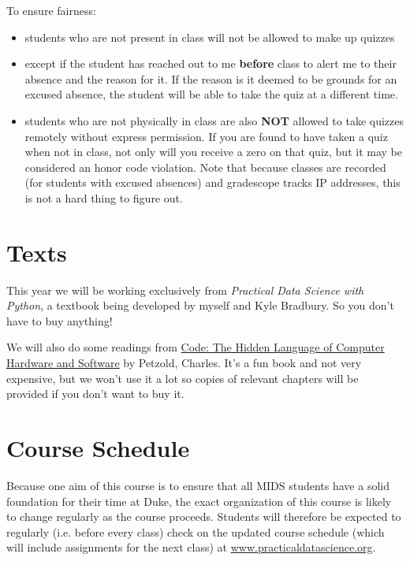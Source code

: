 \documentclass[12pt]{article}
\begin{document}
To ensure fairness: 

\begin{itemize}
	\item students who are not present in class will not be allowed to make up quizzes
	\item except if the student has reached out to me \textbf{before} class to alert me to their absence and the reason for it. If the reason is it deemed to be grounds for an excused absence, the student will be able to take the quiz at a different time.
	\item students who are not physically in class are also \textbf{NOT} allowed to take quizzes remotely without express permission. If you are found to have taken a quiz when not in class, not only will you receive a zero on that quiz, but it may be considered an honor code violation. Note that because classes are recorded (for students with excused absences) and gradescope tracks IP addresses, this is not a hard thing to figure out.
\end{itemize}


\section{Texts}

This year we will be working exclusively from \emph{Practical Data Science with Python}, a textbook being developed by myself and Kyle Bradbury. So you don't have to buy anything!

We will also do some readings from \href{https://www.amazon.com/Code-Language-Computer-Hardware-Software/dp/0735611319}{Code: The Hidden Language of Computer Hardware and Software} by Petzold, Charles. It's a fun book and not very expensive, but we won't use it a lot so copies of relevant chapters will be provided if you don't want to buy it.

\section{Course Schedule}

Because one aim of this course is to ensure that all MIDS students have a solid foundation for their time at Duke, the exact organization of this course is likely to change regularly as the course proceeds. Students will therefore be expected to regularly (i.e. before every class) check on the updated course schedule (which will include assignments for the next class) at \href{https://www.practicaldatascience.org}{www.practicaldatascience.org}.
\end{document}
